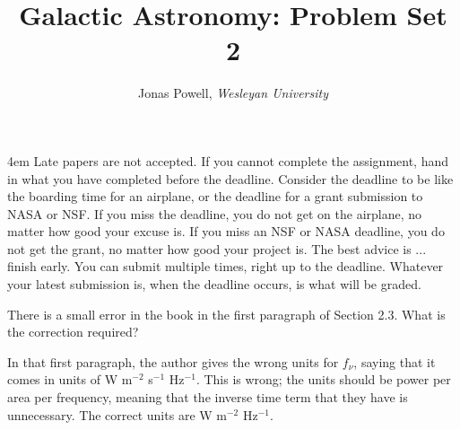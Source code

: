 \documentclass[12pt]{article}
\newenvironment{problem}[2][Problem]{\begin{trivlist}
\item[\hskip \labelsep {\bfseries #1}\hskip \labelsep {\bfseries #2.}]}{\end{trivlist}}
\newenvironment{answer}[2][Answer]{\begin{trivlist}
\item[\hskip \labelsep {\bfseries #1}\hskip \labelsep {\bfseries #2.}]}{\end{trivlist}}
\begin{document}



\title{\Large \textbf{Galactic Astronomy: Problem Set 2}}

\author{{\rm Jonas Powell, \textit{Wesleyan University}}}


\maketitle


\begin{addmargin}[4em]{4em}
 Late papers are not accepted. If you cannot complete the assignment, hand in what you have completed before the deadline. Consider the deadline to be like the boarding time for an airplane, or the deadline for a grant submission to NASA or NSF. If you miss the deadline, you do not get on the airplane, no matter how good your excuse is. If you miss an NSF or NASA deadline, you do not get the grant, no matter how good your project is. The best advice is ... finish early. You can submit multiple times, right up to the deadline. Whatever your latest submission is, when the deadline occurs, is what will be graded.
\bigskip \bigskip
\end{addmargin}




\begin{problem}{1}
  There is a small error in the book in the first paragraph of Section 2.3. What is the correction required?
\end{problem}

\begin{answer}{1}
  In that first paragraph, the author gives the wrong units for $f_\nu$, saying that it comes in units of W m$^{-2}$ s$^{-1}$ Hz$^{-1}$. This is wrong; the units should be power per area per frequency, meaning that the inverse time term that they have is unnecessary. The correct units are W m$^{-2}$ Hz$^{-1}$.
\end{answer}
\end{document}
